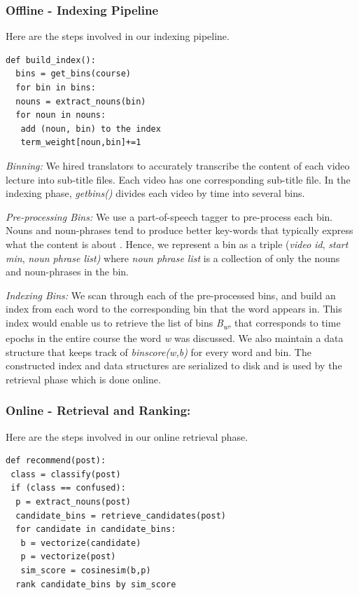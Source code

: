 \documentclass{edm_template}
\begin{document}
\subsubsection{Offline - Indexing Pipeline}

Here are the steps involved in our indexing pipeline.
\begin{lstlisting}[frame=single]
def build_index():
  bins = get_bins(course)
  for bin in bins:
  nouns = extract_nouns(bin)
  for noun in nouns:
   add (noun, bin) to the index
   term_weight[noun,bin]+=1
\end{lstlisting}
\textit{Binning:}
We hired translators to accurately transcribe the content of each video lecture into sub-title files. Each video has one corresponding sub-title file. In the indexing phase, \textit{get\textunderscore bins()} divides each video by time into several bins.

\textit{Pre-processing Bins:}
We use a part-of-speech tagger \cite{nltk} to pre-process each bin. Nouns and noun-phrases tend to produce better key-words that typically express what the content is about \cite{hulth2003improved}. Hence, we represent a bin as a triple (\textit{video \textunderscore id}, \textit{start \textunderscore min}, \textit{noun \textunderscore phrase \textunderscore list)} where \textit{noun \textunderscore phrase \textunderscore list} is a collection of only the nouns and noun-phrases in the bin.

\textit{Indexing Bins:}
We scan through each of the pre-processed bins, and build an index from each word to the corresponding bin that the word appears in. This index would enable us to retrieve the list of bins \textit{B\textsubscript{w}}, that corresponds to time epochs in the entire course the word \textit{w} was discussed. We also maintain a data structure that keeps track of \textit{bin\textunderscore score(w,b)} for every word and bin. The constructed index and data structures are serialized to disk and is used by the retrieval phase which is done online.
\subsubsection{Online - Retrieval and Ranking:}
Here are the steps involved in our online retrieval phase.

\begin{lstlisting}[frame=single]
def recommend(post):
 class = classify(post)
 if (class == confused):
  p = extract_nouns(post)
  candidate_bins = retrieve_candidates(post)
  for candidate in candidate_bins:
   b = vectorize(candidate)
   p = vectorize(post)
   sim_score = cosinesim(b,p)
  rank candidate_bins by sim_score
\end{lstlisting}
\end{document}
